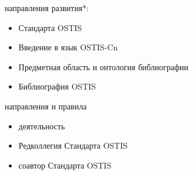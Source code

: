 \begin{SCn}
\begin{scnstruct}
{\begin{scnitemize}
\begin{itemize}
			\end{itemize}
		\end{scnitemize}
		\begin{scnitemize}
			\item направления развития*:
			\begin{itemize}
				\item Стандарта OSTIS
				\item Введение в язык OSTIS-Cn
				\item Предметная область и онтология библиографии
				\item Библиография OSTIS
			\end{itemize}
		\end{scnitemize}
		\begin{scnitemize}
			\item направления и правила
			\begin{itemize}
				\item деятельность
				\item Редколлегия Стандарта OSTIS
				\item соавтор Стандарта OSTIS
			\end{itemize}
		\end{scnitemize}
	}
\end{scnstruct}
\end{SCn}